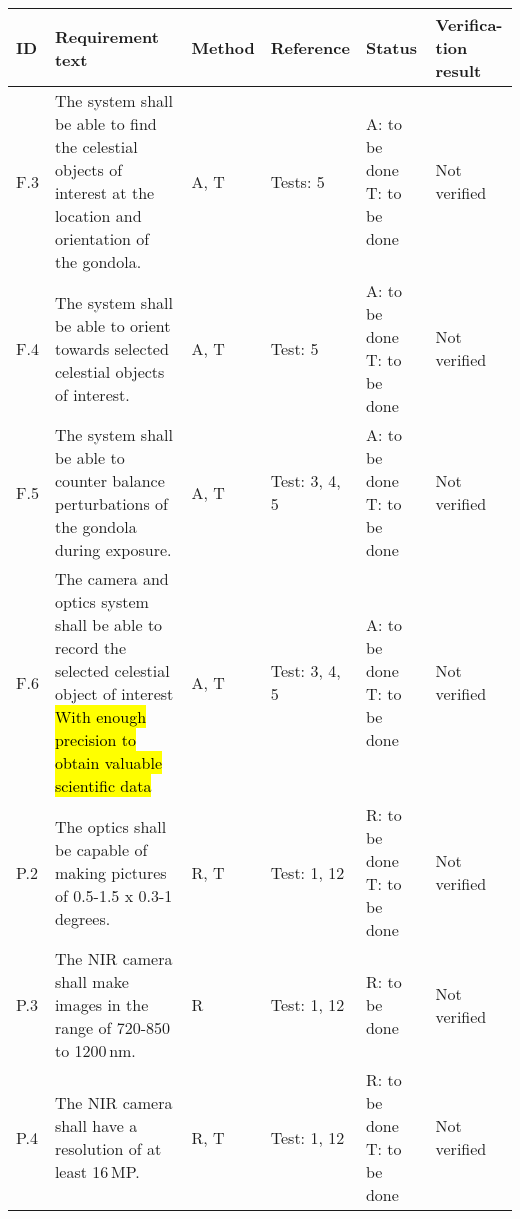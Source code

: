 
\makeatletter
\renewcommand\@makefntext[1]{\leftskip=3em\hskip-1em\@makefnmark#1}
\makeatother

\begin{longtable}[]{|m{}| m{}|m{}|m{}|m{}|m{}|}

\hline
\textbf{ID} & \textbf{Requirement text} & \textbf{Method} & \textbf{Reference} & \textbf{Status} & \textbf{Verifica-tion result} \\\hline

 F.3 & The system shall be able to find the celestial objects of interest at the location and orientation of the gondola.
& A, T & Tests: 5 & A: to be done \newline T: to be done & Not verified \\\hline

  F.4 & The system shall be able to orient towards selected celestial objects of interest.
& A, T & Test: 5 & A: to be done \newline T: to be done & Not verified \\\hline

  F.5 & The system shall be able to counter balance perturbations of the gondola during exposure.
& A, T & Test: 3, 4, 5 & A: to be done \newline T: to be done & Not verified \\\hline

  F.6 & The camera and optics system shall be able to record the selected celestial object of interest \hl{With enough precision to obtain valuable scientific data}
& A, T & Test: 3, 4, 5 & A: to be done \newline T: to be done & Not verified \\\hline




P.2 & The optics shall be capable of making pictures of 0.5-1.5 x 0.3-1\,degrees.
& R, T & Test: 1, 12 & R: to be done \newline T: to be done  & Not verified \\\hline

P.3 & The NIR camera shall make images in the range of 720-850 to 1200\,nm.
& R & Test: 1, 12 & R: to be done  & Not verified \\\hline

P.4 & The NIR camera shall have a resolution of at least 16\,MP.
& R, T& Test: 1, 12 & R: to be done \newline T: to be done & Not verified \\\hline


\end{longtable}
